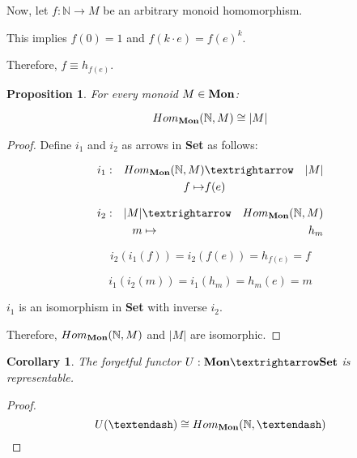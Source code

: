 \documentclass{article}
\newtheorem{proposition}{Proposition}
\newtheorem{corollary}{Corollary}
\begin{document}
\begin{enumerate}
    Now, let $f : \mathbb{N} → M$ be an arbitrary monoid homomorphism.

    This implies $f(0) = 1$ and $f(k·e) = f(e)^k$.

    Therefore, $f \equiv h_{f(e)}$.

    \begin{proposition}
      For every monoid $M \in \text{\bf Mon}$:

      $$Hom_{\text{\bf Mon}}(\mathbb{N}, M) \cong \vert M \vert$$
    \end{proposition}

    \begin{proof}

      Define $i_1$ and $i_2$ as arrows in {\bf Set} as follows:
      
      \begin{align*}
        i_1 & : & Hom_{\text{\bf Mon}}(\mathbb{N}, M) & →        & \vert M \vert \\      
            &   & f                                \mapsto  & f(e)          \\
      \end{align*}

      \begin{align*}
        i_2 & : & \vert M \vert & →     & Hom_{\text{\bf Mon}}(\mathbb{N}, M) \\
            &   &      m        & \mapsto & h_m                          \\
      \end{align*}

      $$i_2(i_1(f)) = i_2(f(e)) = h_{f(e)} = f$$ 

      $$i_1(i_2(m)) = i_1(h_m) = h_m(e) = m$$

      $i_1$ is an isomorphism in {\bf Set} with inverse $i_2$.

      Therefore, $Hom_{\text{\bf Mon}}(\mathbb{N}, M)$ and $\vert M \vert$ are
      isomorphic.
      
    \end{proof}

    \begin{corollary}
      The forgetful functor $U : \text{\bf Mon} → \text{\bf Set}$
      is representable.

    \end{corollary}
    \begin{proof}
      
      $$U(–) \cong Hom_{\text{\bf Mon}}(\mathbb{N}, –)$$
    \end{proof}


\end{enumerate}
\end{document}
